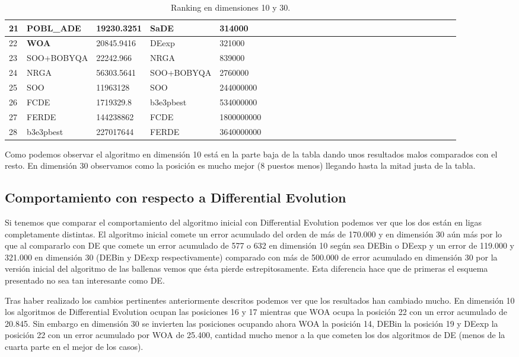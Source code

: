 \documentclass[12pt,a4paper]{article}
\begin{document}
\begin{table}[!h]
{\begin{tabular}{ | l | l | l | l | l | l | l | l | l | l | l | l | l | l | l | l | l | l | l | l | l | l | l | l  |l | l  |l | l | }
				21 & POBL\_ADE & 19230.3251 & SaDE & 314000 \\ \hline
				22 & \textbf{WOA} & 20845.9416 & DEexp & 321000 \\ \hline
				23 & SOO+BOBYQA & 22242.966 & NRGA & 839000 \\ \hline
				24 & NRGA & 56303.5641 & SOO+BOBYQA & 2760000 \\ \hline
				25 & SOO & 11963128 & SOO & 244000000 \\ \hline
				26 & FCDE & 1719329.8 & b3e3pbest & 534000000 \\ \hline
				27 & FERDE & 144238862 & FCDE & 1800000000 \\ \hline
				28 & b3e3pbest & 227017644 & FERDE & 3640000000 \\ \hline
			\end{tabular}
		}
		\label{Ranking}
		\caption{Ranking en dimensiones 10 y 30.}
	\end{table}

	Como podemos observar el algoritmo en dimensión 10 está en la parte baja de la tabla dando unos resultados malos comparados con el resto. En dimensión 30 observamos como la posición es mucho mejor (8 puestos menos) llegando hasta la mitad justa de la tabla.
	
	\subsection{Comportamiento con respecto a Differential Evolution}
	
	Si tenemos que comparar el comportamiento del algoritmo inicial con Differential Evolution podemos ver que los dos están en ligas completamente distintas. El algoritmo inicial comete un error acumulado del orden de más de 170.000 y en dimensión 30 aún más por lo que al compararlo con DE que comete un error acumulado de 577 o 632 en dimensión 10 según sea DEBin o DEexp y un error de 119.000 y 321.000 en dimensión 30 (DEBin y DEexp respectivamente) comparado con más de 500.000 de error acumulado en dimensión 30 por la versión inicial del algoritmo de las ballenas vemos que ésta pierde estrepitosamente. Esta diferencia hace que de primeras el esquema presentado no sea tan interesante como DE.
	
	Tras haber realizado los cambios pertinentes anteriormente descritos podemos ver que los resultados han cambiado mucho. En dimensión 10 los algoritmos de Differential Evolution ocupan las posiciones 16 y 17 mientras que WOA ocupa la posición 22 con un error acumulado de 20.845. Sin embargo en dimensión 30 se invierten las posiciones ocupando ahora WOA la posición 14, DEBin la posición 19 y DEexp la posición 22 con un error acumulado por WOA de 25.400, cantidad mucho menor a la que cometen los dos algoritmos de DE (menos de la cuarta parte en el mejor de los casos).
	
\end{document}
